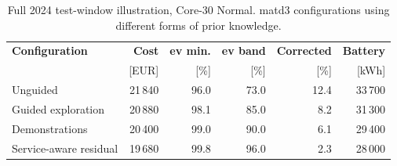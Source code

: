 \begin{table}[!htbp]
\centering
\caption{\illustrativecaption Full 2024 test-window illustration, Core-30 Normal. \gls{matd3} configurations using different forms of prior knowledge.}
\label{tab:control-guidance-scorecard}
\footnotesize
\setlength{\tabcolsep}{3pt}
\renewcommand{\arraystretch}{1.15}
\begin{tabular*}{\textwidth}{@{\extracolsep{\fill}}lrrrrr@{}}
\toprule
\textbf{Configuration} & \textbf{Cost} & \textbf{\gls{ev} min.} & \textbf{\gls{ev} band} & \textbf{Corrected} & \textbf{Battery}\\
 & [EUR] & [\%] & [\%] & [\%] & [kWh]\\
\midrule
Unguided & 21\,840 & 96.0 & 73.0 & 12.4 & 33\,700\\
Guided exploration & 20\,880 & 98.1 & 85.0 & 8.2 & 31\,300\\
Demonstrations & 20\,400 & 99.0 & 90.0 & 6.1 & 29\,400\\
Service-aware residual & 19\,680 & 99.8 & 96.0 & 2.3 & 28\,000\\
\bottomrule
\end{tabular*}
\end{table}
